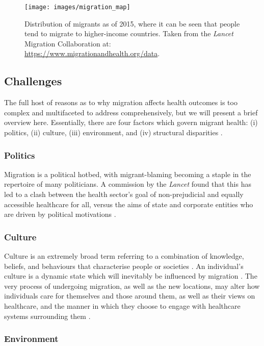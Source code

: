 \afterpage{\clearpage}

\begin{figure}
\texttt{[image: images/migration\_map]}
\caption{Distribution of migrants as of 2015, where it can be seen that people tend to migrate to higher-income countries. Taken from the \emph{Lancet} Migration Collaboration at: \url{https://www.migrationandhealth.org/data}.}
\label{fig:map}
\end{figure}

\subsection{Challenges}

The full host of reasons as to why migration affects health outcomes is too complex and multifaceted to address comprehensively, but we will present a brief overview here. Essentially, there are four factors which govern migrant health: (i) politics, (ii) culture, (iii) environment, and (iv) structural disparities \citep{abubakr2018}. 

\subsubsection{Politics}

Migration is a political hotbed, with migrant-blaming becoming a staple in the repertoire of many politicians. A commission by the \emph{Lancet} found that this has led to a clash between the health sector's goal of non-prejudicial and equally accessible healthcare for all, versus the aims of state and corporate entities who are driven by political motivations \citep{ottersen2014}. 

\subsubsection{Culture}

Culture is an extremely broad term referring to a combination of knowledge, beliefs, and behaviours that characterise people or societies \citep{heyes2020}. An individual's culture is a dynamic state which will inevitably be influenced by migration \citep{abubakr2018}. The very process of undergoing migration, as well as the new locations, may alter how individuals care for themselves and those around them, as well as their views on healthcare, and the manner in which they choose to engage with healthcare systems surrounding them \citep{abubakr2018}. 

\subsubsection{Environment}

